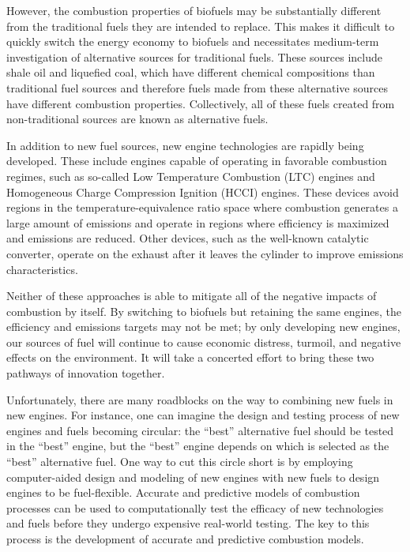 \documentclass[../main.tex]{subfiles}
\begin{document}
However, the combustion
properties of biofuels may be substantially different from the traditional
fuels they are intended to replace. This makes it difficult to quickly switch
the energy economy to biofuels and necessitates medium-term investigation of
alternative sources for traditional fuels. These sources include shale oil and
liquefied coal, which have different chemical compositions than traditional
fuel sources and therefore fuels made from these alternative sources have
different combustion properties. Collectively, all of these fuels created from
non-traditional sources are known as alternative fuels.

In addition to new fuel sources, new engine technologies are rapidly being
developed. These include engines capable of operating in favorable combustion
regimes, such as so-called Low Temperature Combustion (LTC) engines and
Homogeneous Charge Compression Ignition (HCCI) engines. These devices avoid
regions in the temperature-equivalence ratio space where combustion generates a
large amount of emissions and operate in regions where efficiency is
maximized and emissions are reduced. Other devices, such as the well-known
catalytic converter, operate on the exhaust after it leaves the cylinder to
improve emissions characteristics.

Neither of these approaches is able to mitigate all of the negative impacts of
combustion by itself. By switching to biofuels but retaining the same engines,
the efficiency and emissions targets may not be met; by only developing new
engines, our sources of fuel will continue to cause economic distress, turmoil,
and negative effects on the environment. It will take a concerted effort to
bring these two pathways of innovation together.

Unfortunately, there are many roadblocks on the way to combining new fuels in
new engines. For instance, one can imagine the design and testing process of
new engines and fuels becoming circular: the ``best'' alternative fuel should be
tested in the ``best'' engine, but the ``best'' engine depends on which is selected
as the ``best'' alternative fuel. One way to cut this circle short is by
employing computer-aided design and modeling of new engines with new fuels to
design engines to be fuel-flexible. Accurate and predictive models of
combustion processes can be used to computationally test the efficacy of new
technologies and fuels before they undergo expensive real-world testing. The
key to this process is the development of accurate and predictive combustion
models.
\end{document}
